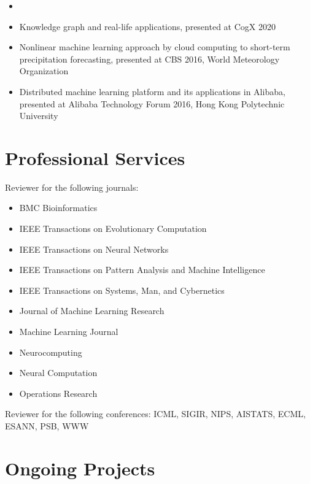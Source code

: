\documentclass[line,10pt,final]{res}
\begin{document}
\begin{resume}
{\begin{itemize}
  \item 
  \item Knowledge graph and real-life applications, presented at CogX 2020
  \item Nonlinear machine learning approach by cloud computing to short-term precipitation forecasting, presented at CBS 2016, World Meteorology Organization
  \item Distributed machine learning platform and its applications in Alibaba,
  presented at Alibaba Technology Forum 2016, Hong Kong Polytechnic University
\end{itemize}



\section{\sc Professional Services}

Reviewer for the following journals: 

\begin{itemize}
\item BMC Bioinformatics
\item IEEE Transactions on Evolutionary Computation
\item IEEE Transactions on Neural Networks
\item IEEE Transactions on Pattern Analysis and Machine Intelligence
\item IEEE Transactions on Systems, Man, and Cybernetics
\item Journal of Machine Learning Research 
\item Machine Learning Journal
\item Neurocomputing 
\item Neural Computation 
\item Operations Research
\end{itemize}

Reviewer for the following conferences: ICML, SIGIR, NIPS, AISTATS, ECML, ESANN, PSB, WWW



\section{\sc Ongoing Projects}

}
\end{resume}
\end{document}
